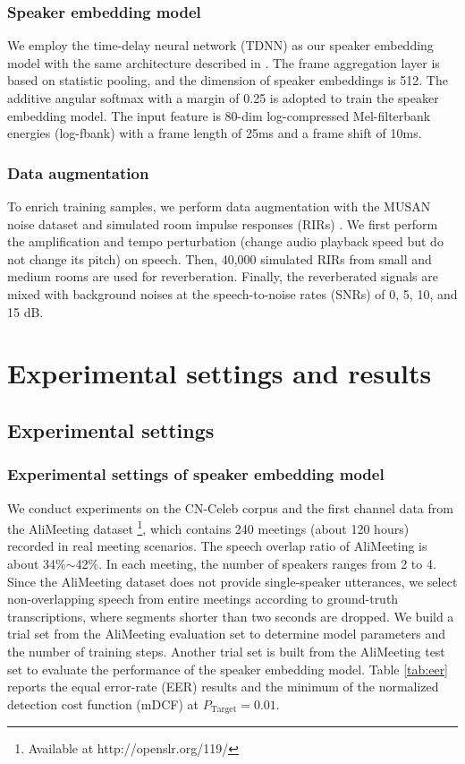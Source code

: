 \documentclass[a4paper]{article}
\begin{document}
\subsubsection{Speaker embedding model}
We employ the time-delay neural network (TDNN) as our speaker embedding model with the same architecture described in \cite{SnyderGPK17}.
The frame aggregation layer is based on statistic pooling, and the dimension of speaker embeddings is 512.
The additive angular softmax \cite{DengGXZ19} with a margin of 0.25 is adopted to train the speaker embedding model.
The input feature is 80-dim log-compressed Mel-filterbank energies (log-fbank) with a frame length of 25ms and a frame shift of 10ms.

\subsubsection{Data augmentation}
To enrich training samples, we perform data augmentation with the MUSAN noise dataset \cite{musan2015} and simulated room impulse responses (RIRs) \cite{KoPPSK17}.
We first perform the amplification and tempo perturbation (change audio playback speed but do not change its pitch) on speech.
Then, 40,000 simulated RIRs from small and medium rooms are used for reverberation.
Finally, the reverberated signals are mixed with background noises at the speech-to-noise rates (SNRs) of 0, 5, 10, and 15 dB.


\section{Experimental settings and results}
\subsection{Experimental settings}
\subsubsection{Experimental settings of speaker embedding model}
We conduct experiments on the CN-Celeb \cite{FanKLLCCZZCW20} corpus and the first channel data from the AliMeeting dataset \cite{FanYu2022}\footnote{Available at http://openslr.org/119/}, which contains 240 meetings (about 120 hours) recorded in real meeting scenarios. 
The speech overlap ratio of AliMeeting is about 34\%$\sim$42\%. In each meeting, the number of speakers ranges from 2 to 4.
Since the AliMeeting dataset does not provide single-speaker utterances, we select non-overlapping speech from entire meetings according to ground-truth transcriptions, where segments shorter than two seconds are dropped.
We build a trial set from the AliMeeting evaluation set to determine model parameters and the number of training steps. 
Another trial set is built from the AliMeeting test set to evaluate the performance of the speaker embedding model. Table \ref{tab:eer} reports the equal error-rate (EER) results and the minimum of the normalized detection cost function (mDCF) at $P_{\text{Target}}=0.01$.
\end{document}
